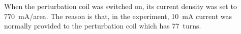 




When the perturbation coil was switched on, its current density was set to 770~mA/area.  The reason is that, in the experiment, 10~mA current was normally provided to the perturbation coil which has
77~turns.



